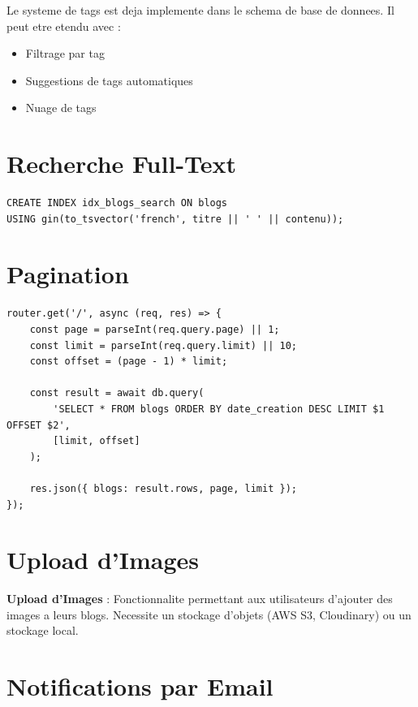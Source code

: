 \documentclass[a4paper,12pt]{book}
\begin{document}
Le systeme de tags est deja implemente dans le schema de base de donnees. Il peut etre etendu avec :
\begin{itemize}
    \item Filtrage par tag
    \item Suggestions de tags automatiques
    \item Nuage de tags
\end{itemize}

\section{Recherche Full-Text}

\begin{lstlisting}[style=sql, caption=Index full-text pour la recherche]
CREATE INDEX idx_blogs_search ON blogs
USING gin(to_tsvector('french', titre || ' ' || contenu));
\end{lstlisting}

\section{Pagination}

\begin{lstlisting}[style=javascript, caption=Implementation de la pagination]
router.get('/', async (req, res) => {
    const page = parseInt(req.query.page) || 1;
    const limit = parseInt(req.query.limit) || 10;
    const offset = (page - 1) * limit;

    const result = await db.query(
        'SELECT * FROM blogs ORDER BY date_creation DESC LIMIT $1 OFFSET $2',
        [limit, offset]
    );

    res.json({ blogs: result.rows, page, limit });
});
\end{lstlisting}

\section{Upload d'Images}

\begin{definitionbox}
    \textbf{Upload d'Images} : Fonctionnalite permettant aux utilisateurs d'ajouter des images a leurs blogs. Necessite un stockage d'objets (AWS S3, Cloudinary) ou un stockage local.
\end{definitionbox}

\section{Notifications par Email}
\end{document}
